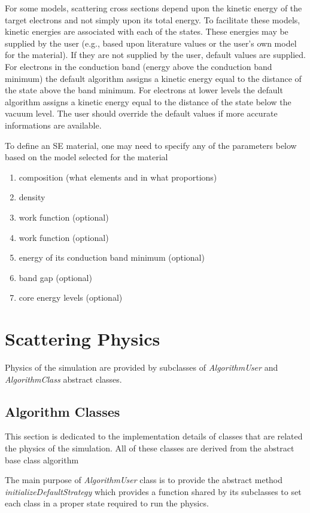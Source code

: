 For some models, scattering cross sections depend upon the kinetic energy of the target electrons and not simply upon its total energy. To facilitate these models, kinetic energies are associated with each of the states. These energies may be supplied by the user (e.g., based upon literature values or the user's own model for the material). If they are not supplied by the user, default values are supplied. For electrons in the conduction band (energy above the conduction band minimum) the default algorithm assigns a kinetic energy equal to the distance of the state above the band minimum. For electrons at lower levels the default algorithm assigns a kinetic energy equal to the distance of the state below the vacuum level. The user should override the default values if more accurate informations are available. 

To define an SE material, one may need to specify any of the parameters below based on the model selected for the material
\begin{enumerate}
\item composition (what elements and in what proportions)
\item density
\item work function (optional)
\item work function (optional)
\item energy of its conduction band minimum (optional)
\item band gap (optional)
\item core energy levels (optional)
\end{enumerate}

\section{Scattering Physics}
Physics of the simulation are provided by subclasses of \textit{AlgorithmUser} and \textit{AlgorithmClass} abstract classes.

\subsection{Algorithm Classes}
This section is dedicated to the implementation details of classes that are related the physics of the simulation. All of these classes are derived from the abstract base class algorithm 

The main purpose of \textit{AlgorithmUser} class is to provide the abstract method \textit{initializeDefaultStrategy} which provides a function shared by its subclasses to set each class in a proper state required to run the physics. 

